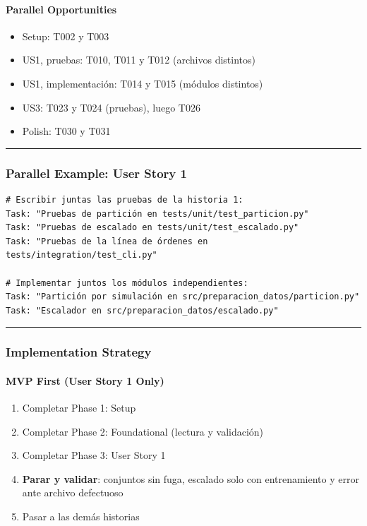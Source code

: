 \documentclass[12pt,a4paper]{article}
\providecommand{\tightlist}{\setlength{\itemsep}{0pt}\setlength{\parskip}{0pt}}
\newenvironment{documentogenerado}[2]{%
  \def\doccomando{#1}\def\docruta{#2}%
  \par\begingroup\small\setstretch{1.15}\sloppy%
}{\endgroup\par\medskip}
\begin{document}
\begin{documentogenerado}{/speckit-tasks (fase 7: /speckit-converge)}{specs\slash 001-preparacion-datos\slash tasks.md}
\paragraph{Parallel Opportunities}

\begin{itemize}
\tightlist
\item
  Setup: T002 y T003
\item
  US1, pruebas: T010, T011 y T012 (archivos distintos)
\item
  US1, implementación: T014 y T015 (módulos distintos)
\item
  US3: T023 y T024 (pruebas), luego T026
\item
  Polish: T030 y T031
\end{itemize}

\begin{center}\rule{0.5\linewidth}{0.5pt}\end{center}

\subsubsection{Parallel Example: User Story 1}

\begin{Verbatim}[breaklines,breakanywhere]
# Escribir juntas las pruebas de la historia 1:
Task: "Pruebas de partición en tests/unit/test_particion.py"
Task: "Pruebas de escalado en tests/unit/test_escalado.py"
Task: "Pruebas de la línea de órdenes en tests/integration/test_cli.py"

# Implementar juntos los módulos independientes:
Task: "Partición por simulación en src/preparacion_datos/particion.py"
Task: "Escalador en src/preparacion_datos/escalado.py"
\end{Verbatim}

\begin{center}\rule{0.5\linewidth}{0.5pt}\end{center}

\subsubsection{Implementation Strategy}

\paragraph{MVP First (User Story 1 Only)}

\begin{enumerate}
\def\labelenumi{\arabic{enumi}.}
\tightlist
\item
  Completar Phase 1: Setup
\item
  Completar Phase 2: Foundational (lectura y validación)
\item
  Completar Phase 3: User Story 1
\item
  \textbf{Parar y validar}: conjuntos sin fuga, escalado solo con entrenamiento y error ante archivo defectuoso
\item
  Pasar a las demás historias
\end{enumerate}


\end{documentogenerado}
\end{document}
